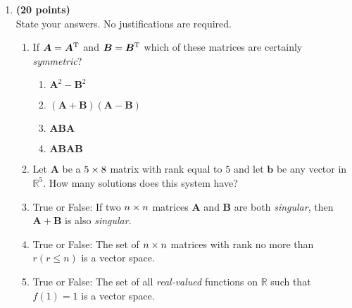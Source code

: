\begin{enumerate}
\newpage
\item \textbf{(20 points)} \\
State your answers. No justifications are required.
\begin{enumerate}
\item
If $\bm A=\bm A^{\mathrm T}$ and $\bm B=\bm B^{\mathrm T}$ which of these matrices are certainly \textit{symmetric}?
\begin{enumerate}
\item
$\bm A^2-\bm B^2$
\item
$(\bm A+\bm B)(\bm A-\bm B)$
\item
$\bm{ABA}$
\item
$\bm{ABAB}$
\end{enumerate}
\item
Let $\bm A$ be a $5\times 8$ matrix with rank equal to $5$ and let $\bm b$ be any vector in $\mathbb{R}^5$. How many solutions does this system have?\\
\item
True or False: If two $n\times n$ matrices $\bm A$ and $\bm B$ are both \textit{singular}, then $\bm A+\bm B$ is also \textit{singular}.\\
\item
True or False: The set of $n\times n$ matrices with rank no more than $r(r\le n)$ is a vector space.\\
\item
True or False: The set of all \textit{real-valued} functions on $\mathbb{R}$ such that $f(1)=1$ is a vector space.
\end{enumerate}
\end{enumerate}
